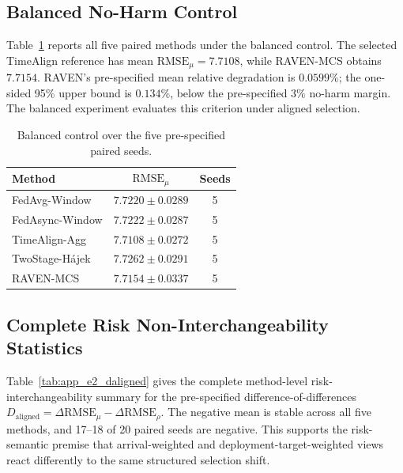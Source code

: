 \subsection{Balanced No-Harm Control}

Table~\ref{tab:app_e1_balanced} reports all five paired methods under the balanced
control.  The selected TimeAlign reference has mean
$\mathrm{RMSE}_\mu=7.7108$, while RAVEN-MCS obtains $7.7154$.  RAVEN's
pre-specified mean relative degradation is $0.0599\%$; the one-sided 95\%
upper bound is $0.134\%$, below the pre-specified $3\%$ no-harm margin.
The balanced experiment evaluates this criterion under aligned selection.

\begin{table}[!htbp]
\centering
\caption{Balanced control over the five pre-specified paired seeds.}
\label{tab:app_e1_balanced}
\footnotesize
\setlength{\tabcolsep}{5pt}
\begin{tabular*}{\columnwidth}{@{\extracolsep{\fill}}lcc}
\toprule
Method & $\mathrm{RMSE}_\mu$ & Seeds\\
\midrule
FedAvg-Window & $7.7220\pm0.0289$ & 5 \\
FedAsync-Window & $7.7222\pm0.0287$ & 5 \\
TimeAlign-Agg & $7.7108\pm0.0272$ & 5 \\
TwoStage-H\'ajek & $7.7262\pm0.0291$ & 5 \\
RAVEN-MCS & $7.7154\pm0.0337$ & 5 \\
\bottomrule
\end{tabular*}
\end{table}

\subsection{Complete Risk Non-Interchangeability Statistics}

Table~\ref{tab:app_e2_daligned} gives the complete method-level risk-interchangeability summary for
the pre-specified difference-of-differences
$D_{\mathrm{aligned}}=\Delta\mathrm{RMSE}_{\mu}
-\Delta\mathrm{RMSE}_{\rho}$.  The negative mean is stable across all five
methods, and 17--18 of 20 paired seeds are negative.  This supports the
risk-semantic premise that arrival-weighted and deployment-target-weighted
views react differently to the same structured selection shift.

